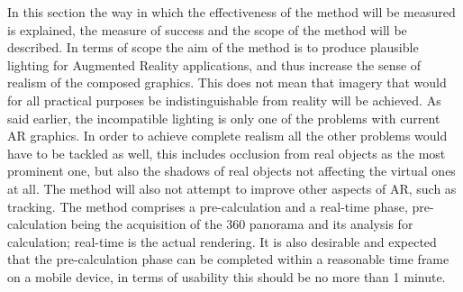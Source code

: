
In this section the way in which the effectiveness of the method will be measured is explained, the measure of success and the scope of the method will be described. In terms of scope the aim of the method is to produce plausible lighting for Augmented Reality applications, and thus increase the sense of realism of the composed graphics. This does not mean that imagery that would for all practical purposes be indistinguishable from reality will be achieved. As said earlier, the incompatible lighting is only one of the problems with current AR graphics. In order to achieve complete realism all the other problems would have to be tackled as well, this includes occlusion from real objects as the most prominent one, but also the shadows of real objects not affecting the virtual ones at all. The method will also not attempt to improve other aspects of AR, such as tracking. The method comprises a pre-calculation and a real-time phase, pre-calculation being the acquisition of the 360 panorama and its analysis for calculation; real-time is the actual rendering. It is also desirable and expected that the pre-calculation phase can be completed within a reasonable time frame on a mobile device, in terms of usability this should be no more than 1 minute.\newline
